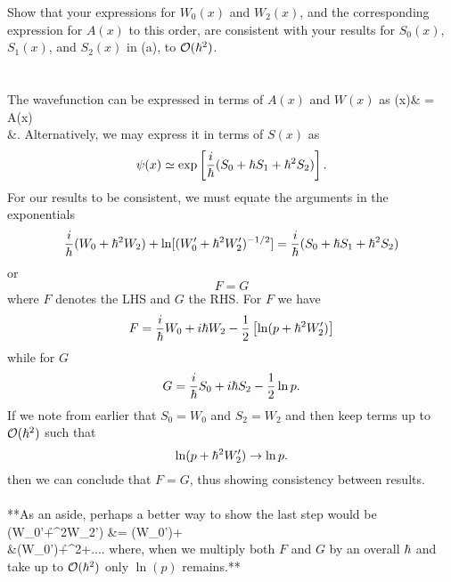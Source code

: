 \documentclass[11pt,letterpaper]{article}
\begin{document}
		\item
		Show that your expressions for $W_0(x)$ and $W_2(x)$, and the corresponding expression for $A(x)$ to this order, are 
		consistent with your results for $S_0(x)$, $S_1(x)$, and $S_2(x)$ in (a), to $\mathcal O(\hbar^2)$. 
		\\
		\\
		\\
		The wavefunction can be expressed in terms of $A(x)$ and $W(x)$ as
		\ba
			\psi(x)& = A(x)\exp{}\\
			&\simeq \exp{}.
		\ea
		Alternatively, we may express it in terms of  $S(x)$ as
		\[
			\psi(x) \simeq \exp\left[\frac{i}{\hbar}(S_0+\hbar S_1+\hbar^2S_2)\right].
		\]
		For our results to be consistent, we must equate the arguments in the exponentials
		\[
			\frac{i}{h}(W_0+\hbar^2W_2)+\ln[(W_0'+\hbar^2W_2')^{-1/2}] = \frac{i}{\hbar}(S_0+\hbar S_1+\hbar^2S_2)
		\]
		or 
		\[
			F=G
		\]
		where $F$ denotes the LHS and $G$ the RHS. For $F$ we have
		\[
			F = \frac{i}{\hbar}W_0+ i\hbar W_2-\frac{1}{2}\left[\ln(p+\hbar^2W_2')\right]
		\]
		while for $G$
		\[
			G = \frac{i}{\hbar}S_0 + i\hbar S_2 -\frac{1}{2}\ln p.
		\]
		If we note from earlier that $S_0 = W_0$ and $S_2 = W_2$ and then keep terms up to $\mathcal O(\hbar^2)$ such that
		\[
			\ln(p+\hbar^2W_2')\to \ln p.
		\]
		then we can conclude that $F=G$, thus showing consistency between results. 
		\\
		\\
		**As an aside, perhaps a better way to show the last step would be 
		\ba
			\ln(W_0'+\h^2W_2') &= \ln(W_0')+\ln{}\\
			&\approx \ln(W_0')+\h^2+....
		\ea
		where, when we multiply both $F$ and $G$ by an overall $\hbar$ and take up to $\mathcal O(\hbar^2)$ only $\ln(p)$ remains.**
		\\
		\\
		\eenum
	\item
	\benum
		
\end{document}
